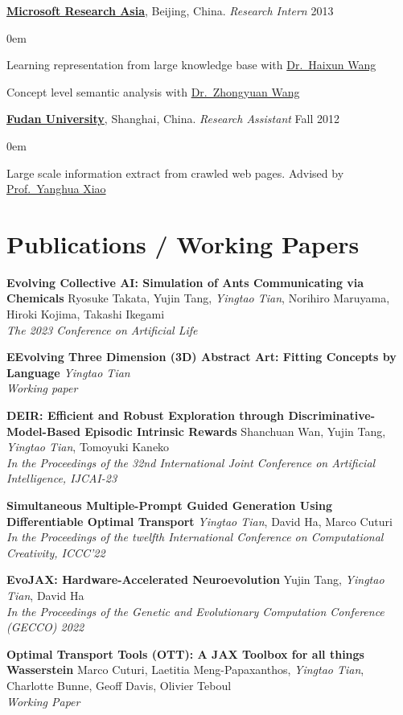 \documentclass[line,margin]{cv}
\newenvironment{block}
{
	\begin{addmargin}[2em]{0em}%
}
{
	\end{addmargin}
}
\newcommand{\Fudan}{\href{http://www.fudan.edu.cn/englishnew/}{Fudan University}}
\newcommand{\MSRA}{\href{http://research.microsoft.com/en-us/labs/asia/default.aspx}{Microsoft Research Asia}}
\newcommand{\Haixun}{\href{http://haixun.olidu.com/}{Dr.\ Haixun Wang}}
\newcommand{\Zhongyuan}{\href{http://www.wangzhongyuan.com/}{Dr.\ Zhongyuan Wang}}
\newcommand{\Yanghua}{\href{http://gdm.fudan.edu.cn/GDMWiki/Wiki.jsp?page=Yanghuaxiao}{Prof.\ Yanghua Xiao}}
\begin{document}
\begin{resume}
	{\bf \MSRA}, Beijing, China. {\itshape Research Intern} \hfill 2013

	\begin{block}
		Learning representation from large knowledge base with \Haixun

		Concept level semantic analysis with \Zhongyuan
	\end{block}

	{\bf \Fudan}, Shanghai, China. {\itshape Research Assistant} \hfill Fall 2012
	\begin{block}
		Large scale information extract from crawled web pages. Advised by \Yanghua
	\end{block}


\section{Publications / Working Papers}

  {\bf Evolving Collective AI: Simulation of Ants Communicating via Chemicals}
  Ryosuke Takata, Yujin Tang, \emph{Yingtao Tian}, Norihiro Maruyama, Hiroki Kojima, Takashi Ikegami\\
  \emph{The 2023 Conference on Artificial Life}

  {\bf EEvolving Three Dimension (3D) Abstract Art: Fitting Concepts by Language}
  \emph{Yingtao Tian}\\
  \emph{Working paper}

  {\bf DEIR: Efficient and Robust Exploration through Discriminative-Model-Based Episodic Intrinsic Rewards}
  Shanchuan Wan, Yujin Tang, \emph{Yingtao Tian}, Tomoyuki Kaneko\\
  \emph{In the Proceedings of the 32nd International Joint Conference on Artificial Intelligence, IJCAI-23}

  {\bf Simultaneous Multiple-Prompt Guided Generation Using Differentiable Optimal Transport}
  \emph{Yingtao Tian}, David Ha, Marco Cuturi\\
  \emph{In the Proceedings of the twelfth International Conference on Computational Creativity, ICCC'22}

  {\bf EvoJAX: Hardware-Accelerated Neuroevolution}
  Yujin Tang, \emph{Yingtao Tian}, David Ha\\
  \emph{In the Proceedings of the Genetic and Evolutionary Computation Conference (GECCO) 2022}

  {\bf Optimal Transport Tools (OTT): A JAX Toolbox for all things Wasserstein}
  Marco Cuturi, Laetitia Meng-Papaxanthos, \emph{Yingtao Tian}, Charlotte Bunne, Geoff Davis, Olivier Teboul\\
  \emph{Working Paper}


\end{resume}
\end{document}
